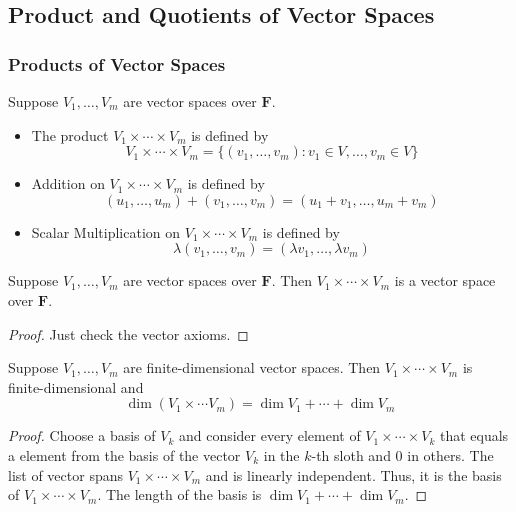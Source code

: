 \subsection{Product and Quotients of Vector Spaces}

\subsubsection{Products of Vector Spaces}

\begin{definition}
    Suppose $V_1,\ldots,V_m$ are vector spaces over $\mathbf{F}$.
    \begin{itemize}
        \item The product $V_1 \times \cdots \times V_m$ is defined by
            \[ V_1 \times \cdots \times V_m = \{(v_1,\ldots,v_m) : v_1 \in V, \ldots, v_m \in V\}  \]
        \item Addition on $V_1 \times \cdots \times V_m$ is defined by
            \[ (u_1,\ldots,u_m) + (v_1,\ldots,v_m) = (u_1 + v_1 , \ldots, u_m + v_m) \]
        \item Scalar Multiplication on $V_1 \times \cdots \times V_m$ is defined by
            \[ \lambda (v_1, \ldots, v_m) = (\lambda v_1, \ldots, \lambda v_m) \]
    \end{itemize}
\end{definition}

\begin{proposition}
    Suppose $V_1,\ldots,V_m$ are vector spaces over $\mathbf{F}$. Then $V_1 \times \cdots \times V_m$ is a vector space over $\mathbf{F}$.
\end{proposition}

\begin{proof}
    Just check the vector axioms.
\end{proof}

\begin{proposition}
    Suppose $V_1, \ldots, V_m$ are finite-dimensional vector spaces. Then $V_1 \times \cdots \times V_m$ is finite-dimensional and
    \[ \dim (V_1 \times \cdots V_m) = \dim V_1 + \cdots + \dim V_m \]
\end{proposition}

\begin{proof}
    Choose a basis of $V_k$ and consider every element of $V_1 \times \cdots \times V_k$ that equals a element from the basis of the vector
    $V_k$ in the $k$-th sloth and $0$ in others. The list of vector spans $V_1 \times \cdots \times V_m$ and is linearly independent. 
    Thus, it is the basis of $V_1 \times \cdots \times V_m$. The length of the basis is $\dim V_1 + \cdots + \dim V_m$.
\end{proof}

